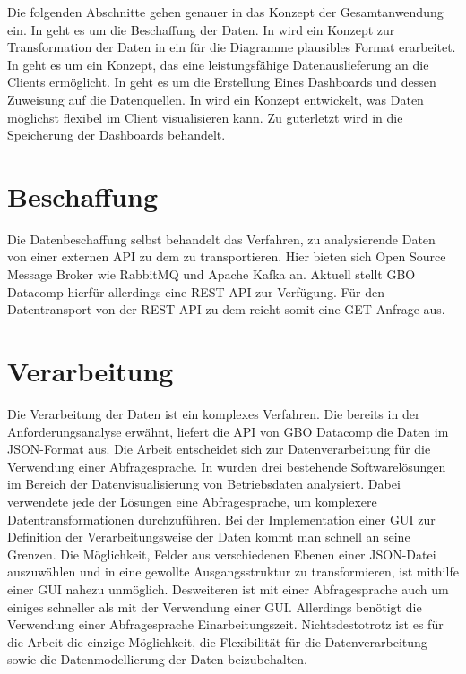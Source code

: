 Die folgenden Abschnitte gehen genauer in das Konzept der Gesamtanwendung ein.
In  geht es um die Beschaffung der Daten. In 
wird ein Konzept zur Transformation der Daten in ein für die Diagramme plausibles Format
erarbeitet. In  geht es um ein Konzept, das
eine leistungsfähige Datenauslieferung an die Clients ermöglicht. In 
geht es um die Erstellung Eines Dashboards und dessen Zuweisung auf die
Datenquellen. In  wird ein Konzept entwickelt,
was Daten möglichst flexibel im Client visualisieren kann.
Zu guterletzt wird in  die Speicherung der Dashboards behandelt.

\section{Beschaffung}
\label{sec:beschaffung}
Die Datenbeschaffung selbst behandelt das Verfahren, zu analysierende Daten
von einer externen API zu dem  zu transportieren.
Hier bieten sich Open Source Message Broker wie RabbitMQ und Apache Kafka an.
Aktuell stellt GBO Datacomp hierfür allerdings eine REST-API zur Verfügung.
Für den Datentransport von der REST-API zu dem  reicht somit
eine GET-Anfrage aus.

\section{Verarbeitung}
\label{sec:verarbeitung}
Die Verarbeitung der Daten ist ein komplexes Verfahren. Die bereits in der
Anforderungsanalyse erwähnt, liefert die API von GBO Datacomp die Daten im
JSON-Format aus. Die Arbeit entscheidet sich zur Datenverarbeitung für die
Verwendung einer Abfragesprache. In 
wurden drei bestehende Softwarelösungen im Bereich der Datenvisualisierung von
Betriebsdaten analysiert. Dabei verwendete jede der Lösungen eine Abfragesprache,
um komplexere Datentransformationen durchzuführen. Bei der Implementation einer
GUI zur Definition der Verarbeitungsweise der Daten kommt man schnell an seine Grenzen.
Die Möglichkeit, Felder aus verschiedenen Ebenen einer JSON-Datei auszuwählen
und in eine gewollte Ausgangsstruktur zu transformieren, ist mithilfe einer GUI nahezu
unmöglich. Desweiteren ist mit einer Abfragesprache auch um einiges schneller als mit
der Verwendung einer GUI. Allerdings benötigt die Verwendung einer Abfragesprache
Einarbeitungszeit. Nichtsdestotrotz ist es für die Arbeit die einzige Möglichkeit,
die Flexibilität für die Datenverarbeitung sowie die Datenmodellierung der Daten
beizubehalten.


